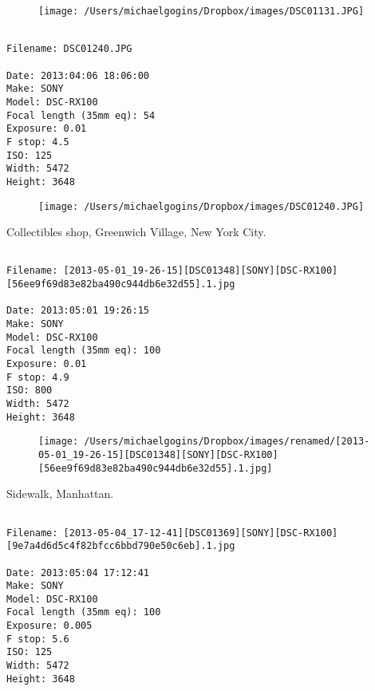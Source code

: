 \begin{figure}
\texttt{[image: /Users/michaelgogins/Dropbox/images/DSC01131.JPG]}
\end{figure}
    
\clearpage
\onecolumn
\noindent 
\noindent
\begin{lstlisting}

Filename: DSC01240.JPG

Date: 2013:04:06 18:06:00
Make: SONY
Model: DSC-RX100
Focal length (35mm eq): 54
Exposure: 0.01
F stop: 4.5
ISO: 125
Width: 5472
Height: 3648
\end{lstlisting}
\clearpage

\begin{figure}
\texttt{[image: /Users/michaelgogins/Dropbox/images/DSC01240.JPG]}
\end{figure}
    
\clearpage
\onecolumn
\noindent Collectibles shop, Greenwich Village, New York City.
\noindent
\begin{lstlisting}

Filename: [2013-05-01_19-26-15][DSC01348][SONY][DSC-RX100][56ee9f69d83e82ba490c944db6e32d55].1.jpg

Date: 2013:05:01 19:26:15
Make: SONY
Model: DSC-RX100
Focal length (35mm eq): 100
Exposure: 0.01
F stop: 4.9
ISO: 800
Width: 5472
Height: 3648
\end{lstlisting}
\clearpage

\begin{figure}
\texttt{[image: /Users/michaelgogins/Dropbox/images/renamed/[2013-05-01\_19-26-15][DSC01348][SONY][DSC-RX100][56ee9f69d83e82ba490c944db6e32d55].1.jpg]}
\end{figure}
    
\clearpage
\onecolumn
\noindent Sidewalk, Manhattan.
\noindent
\begin{lstlisting}

Filename: [2013-05-04_17-12-41][DSC01369][SONY][DSC-RX100][9e7a4d6d5c4f82bfcc6bbd790e50c6eb].1.jpg

Date: 2013:05:04 17:12:41
Make: SONY
Model: DSC-RX100
Focal length (35mm eq): 100
Exposure: 0.005
F stop: 5.6
ISO: 125
Width: 5472
Height: 3648
\end{lstlisting}
\clearpage

